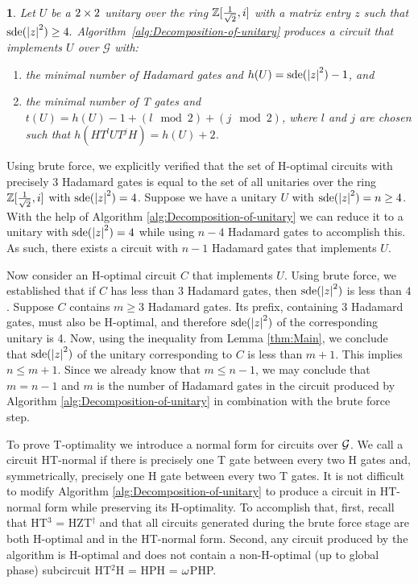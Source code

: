 \documentclass[english,journal]{extarticle}
\makeatletter
\theoremstyle{plain}
\newtheorem{thm}{\protect\theoremname}
\theoremstyle{plain}
\theoremstyle{plain}
\theoremstyle{definition}
\theoremstyle{plain}
\newenvironment{proof}[1][\proofname]{\par
     \normalfont\topsep6\p@\@plus6\p@\relax
     \trivlist
     \itemindent\parindent
     \item[\hskip\labelsep
           \scshape
       #1]\ignorespaces
   }{%
     \endtrivlist\@endpefalse
   }
\providecommand{\proofname}{Proof}
\theoremstyle{plain}
\providecommand{\theoremname}{\inputencoding{latin9}Theorem}
\makeatother
\begin{document}
\begin{thm}\label{prop:hnsde}
Let $U$ be a $2\times 2$ unitary over the ring $\mathbb{Z}[\frac{1}{\sqrt{2}},i]$ with a matrix entry $z$ such that $\mathrm{sde}(\left|z\right|^{2})\ge4.$
Algorithm~\ref{alg:Decomposition-of-unitary} produces a circuit that implements $U$ over $\mathcal{G}$ with:
\begin{enumerate}
\item the minimal number of Hadamard gates and $h(U)=\mathrm{sde}(\left|z\right|^{2})-1$, and 
\item the minimal number of T gates and $t(U)=h(U) - 1 + (l \mod 2) + (j \mod 2)$, where $l$ and $j$ are chosen such that $h(H T^l U T^j H)=h(U)+2$.
\end{enumerate}
\end{thm}
\begin{proof}

 Using brute force, we explicitly verified that the set of H-optimal circuits with
precisely 3 Hadamard gates is equal to the set of all unitaries
over the ring $\mathbb{Z}[\frac{1}{\sqrt{2}},i]$ with $\mathrm{sde}(\left|z\right|^{2})=4$. Suppose
we have a unitary $U$ with $\mathrm{sde}(\left|z\right|^{2})=n\ge 4$. With the help of
Algorithm \ref{alg:Decomposition-of-unitary} we can reduce it to
a unitary with $\mathrm{sde}(\left|z\right|^{2})=4$ while using $n-4$ Hadamard
gates to accomplish this.  As such, there exists a circuit with $n-1$ Hadamard gates that
implements $U$. 

Now consider an H-optimal circuit $C$ that implements $U$. Using brute
force, we established that if $C$ has less than 3 Hadamard gates, then $\mathrm{sde}(\left|z\right|^{2})$ is less than $4$. Suppose $C$ contains $m\ge 3$ Hadamard gates. Its
prefix, containing $3$ Hadamard gates, must also be H-optimal, and
therefore $\mathrm{sde}(\left|z\right|^{2})$ of the corresponding unitary is
4. Now, using the inequality from Lemma \ref{thm:Main}, we conclude
that $\mathrm{sde}(\left|z\right|^{2})$ of the unitary corresponding to $C$
is less than $m+1$.  This implies $n\le m+1$.  Since we already know that
$m\le n-1$, we may conclude that $m=n-1$ and $m$ is the number
of Hadamard gates in the circuit produced by Algorithm
\ref{alg:Decomposition-of-unitary}
in combination with the brute force step.

 To prove T-optimality we introduce a normal form for circuits over $\mathcal{G}$.  We call a circuit
HT-normal if there is precisely one T gate between every two H gates and, symmetrically, precisely one H gate between every two T gates.  
It is not difficult to modify Algorithm \ref{alg:Decomposition-of-unitary} to produce a circuit in HT-normal 
form while preserving its H-optimality.  To accomplish that, first, recall that HT$^3$ = HZT$^{\dagger}$ and that all circuits generated 
during the brute force stage are both H-optimal and in the HT-normal form.  Second, any circuit produced by the algorithm 
is H-optimal and does not contain a non-H-optimal (up to global phase) subcircuit HT$^2$H = HPH = $\omega$PHP. 


\end{proof}
\end{document}
